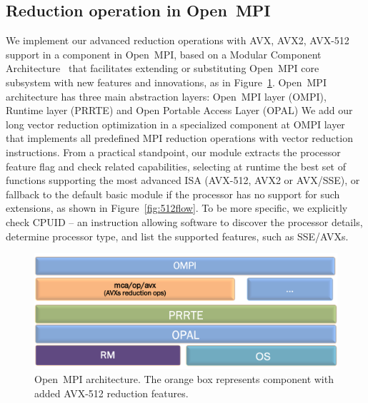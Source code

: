 \documentclass[5p,times,twocolumn]{elsarticle}
\newcommand{\ompi}[0]{Open~MPI\xspace}
\begin{document}
\subsection{Reduction operation in \ompi}
We implement our advanced reduction operations with AVX, AVX2, AVX-512
support in a component in \ompi, based on a Modular Component
Architecture~\cite{gabriel04ompi, dongprrte} that facilitates extending or
substituting \ompi core subsystem with new features and innovations, as in Figure~\ref{fig:avxmca}.
\ompi architecture has three main abstraction layers: \ompi layer (OMPI), Runtime layer (PRRTE) and Open Portable Access Layer (OPAL)
We add our long vector reduction optimization in a specialized component at OMPI layer that
implements all predefined MPI reduction operations with vector
reduction instructions. From a
practical standpoint, our module extracts the processor
feature flag and check related capabilities, selecting at runtime the best set of
functions supporting the most advanced ISA (AVX-512, AVX2 or AVX/SSE),
or fallback to the default basic module if the processor has no
support for such extensions, as shown in Figure~\ref{fig:512flow}.
%
To be more specific, we explicitly check CPUID -- an instruction allowing software to discover the
processor details, determine processor type, and list the supported features, such as
SSE/AVXs.

\begin{figure}[h]
    \centering
    \includegraphics[width=\linewidth]{mca1.png}
    \caption{\ompi architecture. The orange box represents component with added AVX-512 reduction features.}
    \label{fig:avxmca}
\end{figure}
\end{document}

